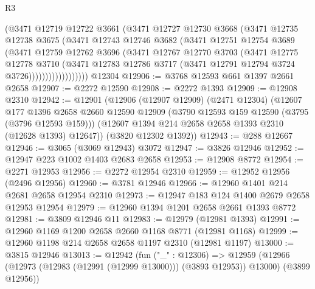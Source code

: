 \begin{lexlean}{R3}
\begin{coremodule}
                    (@3471
                      @12719
                      @12722
                      @3661
                      (@3471
                        @12727
                        @12730
                        @3668
                        (@3471
                          @12735
                          @12738
                          @3675
                          (@3471
                            @12743
                            @12746
                            @3682
                            (@3471
                              @12751
                              @12754
                              @3689
                              (@3471
                                @12759
                                @12762
                                @3696
                                (@3471
                                  @12767
                                  @12770
                                  @3703
                                  (@3471
                                    @12775
                                    @12778
                                    @3710
                                    (@3471
                                      @12783
                                      @12786
                                      @3717
                                      (@3471 @12791 @12794 @3724 @3726))))))))))))))))))
    @12304
@12906 := @3768 @12593 @661 @1397 @2661 @2658
@12907 := @2272 @12590
@12908 := @2272 @1393
@12909 := @12908 @2310
@12942 := @12901
    (@12906
      (@12907 @12909)
      (@2471 @12304)
      (@12607
        @177
        @1396
        @2658
        @2660
        @12590
        @12909
        (@3790 @12593 @159 @12590 (@3795 (@3796 @12593 @159)))
        (@12607 @1394 @214 @2658 @2658 @1393 @2310 (@12628 @1393) @12647))
      (@3820 @12302 @1392))
@12943 := @288 @12667
@12946 := @3065 (@3069 @12943) @3072
@12947 := @3826 @12946
@12952 := @12947 @223 @1002 @1403 @2683 @2658
@12953 := @12908 @8772
@12954 := @2271 @12953
@12956 := @2272 @12954 @2310
@12959 := @12952 @12956 (@2496 @12956)
@12960 := @3781 @12946
@12966 := @12960 @1401 @214 @2681 @2658 @12954 @2310
@12973 := @12947 @183 @124 @1400 @2679 @2658 @12953 @12954
@12979 := @12960 @1394 @1201 @2658 @2661 @1393 @8772
@12981 := @3809 @12946 @11
@12983 := @12979 (@12981 @1393)
@12991 := @12960 @1169 @1200 @2658 @2660 @1168 @8771 (@12981 @1168)
@12999 := @12960 @1198 @214 @2658 @2658 @1197 @2310 (@12981 @1197)
@13000 := @3815 @12946
@13013 := @12942
    (fun ("_" : @12306) =>
    @12959 (@12966 (@12973 (@12983 (@12991 (@12999 @13000))) (@3893 @12953)) @13000) (@3899 @12956))

\end{coremodule}
\end{lexlean}
